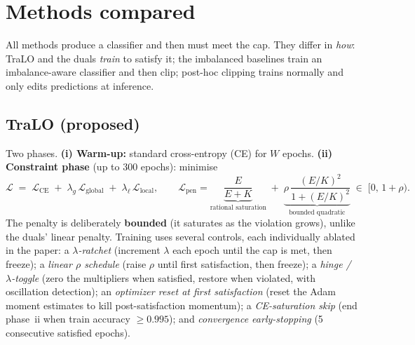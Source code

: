 \documentclass[11pt,a4paper]{article}
\begin{document}
\section{Methods compared}
All methods produce a classifier and then must meet the cap. They differ in \emph{how}: TraLO and the duals
\emph{train} to satisfy it; the imbalanced baselines train an imbalance-aware classifier and then clip;
post-hoc clipping trains normally and only edits predictions at inference.

\subsection{TraLO (proposed)}
Two phases. \textbf{(i) Warm-up:} standard cross-entropy (CE) for $W$ epochs. \textbf{(ii) Constraint phase}
(up to $300$ epochs): minimise
\begin{equation}
\mathcal{L} \;=\; \mathcal{L}_{\text{CE}} \;+\; \lambda_g\,\mathcal{L}_{\text{global}} \;+\;
\lambda_\ell\,\mathcal{L}_{\text{local}},\qquad
\mathcal{L}_{\text{pen}} = \underbrace{\frac{E}{E+K}}_{\text{rational saturation}} \;+\;
\underbrace{\rho\,\frac{(E/K)^2}{1+(E/K)^2}}_{\text{bounded quadratic}} \;\in\; [0,\,1+\rho).
\label{eq:pen}
\end{equation}
The penalty is deliberately \textbf{bounded} (it saturates as the violation grows), unlike the duals' linear
penalty. Training uses several controls, each individually ablated in the paper: a \emph{$\lambda$-ratchet}
(increment $\lambda$ each epoch until the cap is met, then freeze); a \emph{linear $\rho$ schedule} (raise
$\rho$ until first satisfaction, then freeze); a \emph{hinge / $\lambda$-toggle} (zero the multipliers when
satisfied, restore when violated, with oscillation detection); an \emph{optimizer reset at first satisfaction}
(reset the Adam moment estimates to kill post-satisfaction momentum); a \emph{CE-saturation skip} (end phase~ii
when train accuracy $\ge 0.995$); and \emph{convergence early-stopping} (5 consecutive satisfied epochs).
\end{document}

